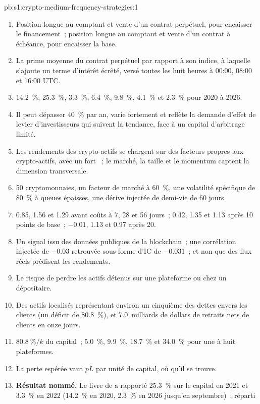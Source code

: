 \begin{solution}{pb:s1:crypto-medium-frequency-strategies:1}
\begin{enumerate}
\item Position longue au comptant et vente d'un contrat perpétuel, pour encaisser le financement~; position longue au comptant et vente d'un contrat à échéance, pour encaisser la base.
\item La prime moyenne du contrat perpétuel par rapport à son indice, à laquelle s'ajoute un terme d'intérêt écrêté, versé toutes les huit heures à 00:00, 08:00 et 16:00 UTC.
\item 14.2~\%, 25.3~\%, 3.3~\%, 6.4~\%, 9.8~\%, 4.1~\% et 2.3~\% pour 2020 à 2026.
\item Il peut dépasser 40~\% par an, varie fortement et reflète la demande d'effet de levier d'investisseurs qui suivent la tendance, face à un capital d'arbitrage limité.
\item Les rendements des crypto-actifs se chargent sur des facteurs propres aux crypto-actifs, avec un fort ~; le marché, la taille et le momentum captent la dimension transversale.
\item 50 cryptomonnaies, un facteur de marché à 60~\%, une volatilité spécifique de 80~\% à queues épaisses, une dérive injectée de demi-vie de 60 jours.
\item 0.85, 1.56 et 1.29 avant coûts à 7, 28 et 56 jours~; 0.42, 1.35 et 1.13 après 10 points de base~; $-0.01$, 1.13 et 0.97 après 20.
\item Un signal issu des données publiques de la blockchain~; une corrélation injectée de $-0.03$ retrouvée sous forme d'IC de $-0.031$~; et non que des flux réels prédisent les rendements.
\item Le risque de perdre les actifs détenus sur une plateforme ou chez un dépositaire.
\item Des actifs localisés représentant environ un cinquième des dettes envers les clients (un déficit de 80.8~\%), et 7.0~milliards de dollars de retraits nets de clients en onze jours.
\item $80.8~\%/k$ du capital~; 5.0~\%, 9.9~\%, 18.7~\% et 34.0~\% pour une à huit plateformes.
\item La perte espérée vaut $pL$ par unité de capital, où qu'il se trouve.
\item \textbf{Résultat nommé.} Le livre de  a rapporté 25.3~\% sur le capital en 2021 et 3.3~\% en 2022 (14.2~\% en 2020, 2.3~\% en 2026 jusqu'en septembre)~; réparti

\end{enumerate}
\end{solution}
